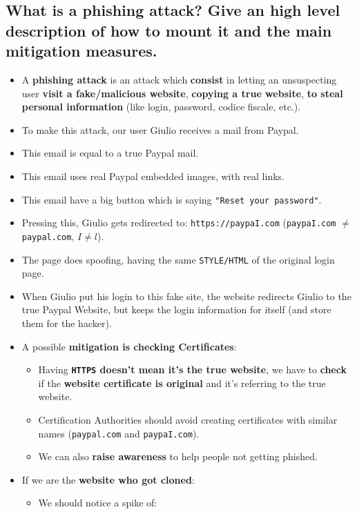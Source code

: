 \documentclass[9pt, letterpaper]{article}
\begin{document}
\newpage

\subsection{What is a phishing attack? Give an high level description of how to mount it and the main mitigation measures.}
\begin{itemize}
	\item A \textbf{phishing attack }is an attack which \textbf{consist} in letting an unsuspecting user \textbf{visit a fake/malicious website}, \textbf{copying a true website}, \textbf{to steal personal information} (like login, password, codice fiscale, etc.).
	\item To make this attack, our user Giulio receives a mail from Paypal.
	\item This email is equal to a true Paypal mail.
	\item This email uses real Paypal embedded images, with real links.
	\item This email have a big button which is saying {\tt "Reset your password"}.
	\item Pressing this, Giulio gets redirected to: {\tt https://paypaI.com} ({\tt paypaI.com} $\neq$ {\tt paypal.com}, $I\ne l$).
	\item The page does spoofing, having the same {\tt STYLE/HTML} of the original login page. 
	\item When Giulio put his login to this fake site, the website redirects Giulio to the true Paypal Website, but keeps the login information for itself (and store them for the hacker).
	\item A possible \textbf{mitigation is checking Certificates}:
	\begin{itemize}
		\item Having \textbf{{\tt HTTPS} doesn't mean it's the true website}, we have to \textbf{check} if the \textbf{website certificate is original} and it's referring to the true website.
		\item Certification Authorities should avoid creating certificates with similar names ({\tt paypal.com} and {\tt paypaI.com}).
		\item We can also \textbf{raise awareness} to help people not getting phished.
	\end{itemize}
	\item If we are the \textbf{website who got cloned}:
	\begin{itemize}
		\item We should notice a spike of:

\end{itemize}
\end{itemize}
\end{document}
